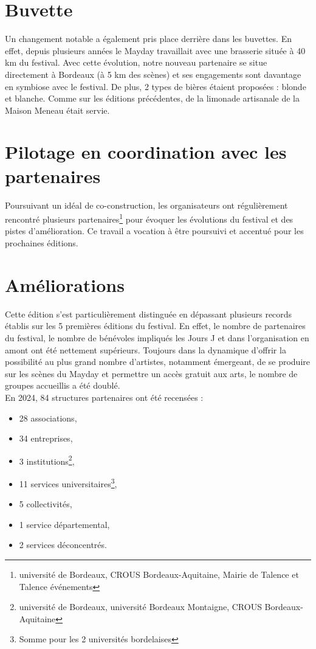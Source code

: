 \documentclass[12pt,a4paper]{report}
\begin{document}
\section{Buvette}
Un changement notable a également pris place derrière dans les buvettes. En effet, depuis plusieurs années le Mayday travaillait avec une brasserie située à 40 km du festival. Avec cette évolution, notre nouveau partenaire se situe directement à Bordeaux (à 5 km des scènes) et ses engagements sont davantage en symbiose avec le festival. De plus, 2 types de bières étaient proposées : blonde et blanche. Comme sur les éditions précédentes, de la limonade artisanale de la Maison Meneau était servie.\\

\section{Pilotage en coordination avec les partenaires}
Poursuivant un idéal de co-construction, les organisateurs ont régulièrement rencontré plusieurs partenaires\footnote{université de Bordeaux, CROUS Bordeaux-Aquitaine, Mairie de Talence et Talence événements} pour évoquer les évolutions du festival et des pistes d’amélioration. Ce travail a vocation à être poursuivi et accentué pour les prochaines éditions.

\section{Améliorations}
Cette édition s'est particulièrement distinguée en dépassant plusieurs records établis sur les 5 premières éditions du festival. En effet, le nombre de partenaires du festival, le nombre de bénévoles impliqués les Jours J et dans l'organisation en amont ont été nettement supérieurs. Toujours dans la dynamique d'offrir la possibilité au plus grand nombre d'artistes, notamment émergeant, de se produire sur les scènes du Mayday et permettre un accès gratuit aux arts, le nombre de groupes accueillis a été doublé.\\

En 2024, 84 structures partenaires ont été recensées :
\begin{itemize}
\item 28 associations,
\item 34 entreprises,
\item 3 institutions\footnote{université de Bordeaux, université Bordeaux Montaigne, CROUS Bordeaux-Aquitaine},
\item 11 services universitaires\footnote{Somme pour les 2 universités bordelaises},
\item 5 collectivités,
\item 1 service départemental,
\item 2 services déconcentrés.\\
\end{itemize}
\end{document}

